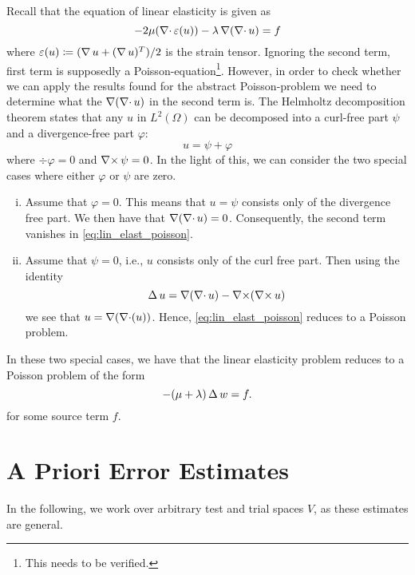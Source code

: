 Recall that the equation of linear elasticity is given as
\begin{equation}
    \label{eq:lin_elast_poisson}
    - 2 \mu ( \operatorname{\mathop{}\!\nabla \cdot} \varepsilon(u)) - \lambda \operatorname{\mathop{}\!\nabla}(\operatorname{\mathop{}\!\nabla \cdot} u) = f
\end{equation}
where \(\varepsilon(u) \coloneqq (\operatorname{\mathop{}\!\nabla} u + (\operatorname{\mathop{}\!\nabla} u)^T) / 2 \) is the strain
tensor. Ignoring the second term, first term is supposedly a
Poisson-equation\footnote{This needs to be verified.}.  However, in order to
check whether we can apply the results found for the abstract Poisson-problem
we need to determine what the \( \operatorname{\mathop{}\!\nabla} (\operatorname{\mathop{}\!\nabla \cdot} u) \) in the second term is. The
Helmholtz decomposition theorem states that any \( u \) in \( L^2(\Omega) \)
can be decomposed into a curl-free part \( \psi \)  and a divergence-free part
\( \varphi \):
\begin{equation}
    u = \psi + \varphi 
\end{equation}
where \(\div \varphi = 0\) and \(  \operatorname{\mathop{}\!\nabla \times} \psi = 0 \).  In the light of this, we
can consider the two special cases where either \( \varphi \) or \( \psi \) are
zero. 
\begin{enumerate}[(i)]
    \item Assume that \( \varphi = 0 \). This means that \( u = \psi \)
        consists only of the divergence free part. We then have that
        \(\operatorname{\mathop{}\!\nabla}(\operatorname{\mathop{}\!\nabla \cdot} u) = 0 \). Consequently, the second term vanishes in
        \cref{eq:lin_elast_poisson}.
    \item Assume that \( \psi = 0 \), i.e., \( u \) consists only of the curl
        free part. Then using the identity
        \begin{equation}
            \operatorname{\mathop{}\!\Delta} u = \operatorname{\mathop{}\!\nabla}(\operatorname{\mathop{}\!\nabla \cdot} u) - \operatorname{\mathop{}\!\nabla \times}(\operatorname{\mathop{}\!\nabla \times} u)
        \end{equation}
        we see that \( u = \operatorname{\mathop{}\!\nabla}(\operatorname{\mathop{}\!\nabla \cdot}(u)) \). Hence,
        \cref{eq:lin_elast_poisson} reduces to a Poisson problem.
\end{enumerate}
In these two special cases, we have that the linear elasticity problem reduces
to a Poisson problem of the form
\begin{equation}
    -(\mu + \lambda)\operatorname{\mathop{}\!\Delta} w = f.
\end{equation}
for some source term \( f \).

\section{A Priori Error Estimates}
\label{sec:a_priori_estimates}

In the following, we work over arbitrary test and trial spaces \( V \), as
these estimates are general.


